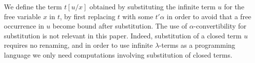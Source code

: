 
We define the term $t[u/x]$ obtained by substituting the infinite term $u$ for the 
free variable $x$ in $t$, by first replacing $t$ with some $t' \alpha $
in order to avoid that a free occurrence in $u$ become bound after substitution. 
The use of $\alpha$-convertibility for substitution is not relevant in this paper. Indeed,
substitution of a closed term $u$ requires no renaming, and  in order to use 
infinite $\lambda$-terms as a programming language we only need computations 
involving substitution of closed terms. 

